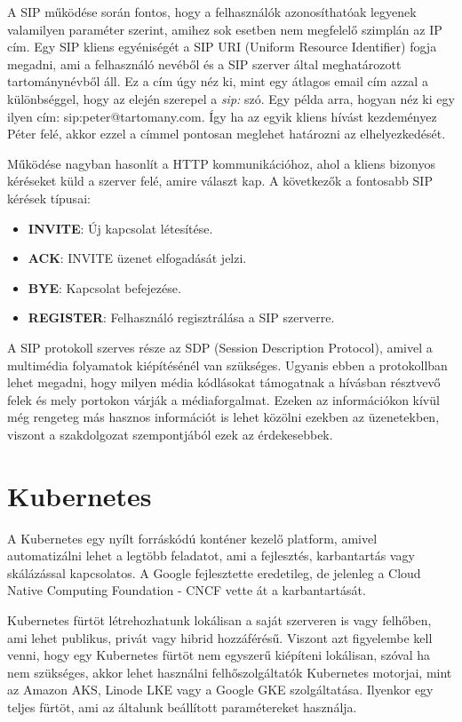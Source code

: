 A SIP működése során fontos, hogy a felhasználók azonosíthatóak legyenek valamilyen
paraméter szerint, amihez sok esetben nem megfelelő szimplán az IP cím. Egy 
SIP kliens egyéniségét a SIP URI (Uniform Resource Identifier) fogja megadni, ami
a  felhasználó nevéből és a SIP szerver által meghatározott tartománynévből áll.
Ez a cím úgy néz ki, mint egy átlagos email cím azzal a különbséggel, hogy az 
elején szerepel a \textit{sip:} szó. Egy példa arra, hogyan néz ki egy ilyen cím: 
sip:peter@tartomany.com. Így ha az egyik kliens hívást kezdeményez Péter felé,
akkor ezzel a címmel pontosan meglehet határozni az elhelyezkedését. 

Működése nagyban hasonlít a HTTP kommunikációhoz, ahol a kliens bizonyos kéréseket
küld a szerver felé, amire választ kap. A következők a fontosabb SIP kérések típusai: 

\begin{itemize}
	\item \textbf{INVITE}: Új kapcsolat létesítése.
	\item \textbf{ACK}: INVITE üzenet elfogadását jelzi. 
	\item \textbf{BYE}: Kapcsolat befejezése. 
	\item \textbf{REGISTER}: Felhasználó regisztrálása a SIP szerverre. 
\end{itemize}

A SIP protokoll szerves része az SDP (Session Description Protocol), amivel a multimédia
folyamatok kiépítésénél van szükséges. Ugyanis ebben a protokollban lehet megadni,
hogy milyen média kódlásokat támogatnak a hívásban résztvevő felek és mely
portokon várják a médiaforgalmat. Ezeken az információkon kívül még rengeteg 
más hasznos információt is lehet közölni ezekben az üzenetekben, viszont a 
szakdolgozat szempontjából ezek az érdekesebbek. 

\section{Kubernetes}

A Kubernetes egy nyílt forráskódú konténer kezelő platform, amivel automatizálni
lehet a legtöbb feladatot, ami a fejlesztés, karbantartás vagy skálázással 
kapcsolatos. A Google fejlesztette eredetileg, de jelenleg a Cloud Native
Computing Foundation - CNCF vette át a karbantartását. 

Kubernetes fürtöt létrehozhatunk lokálisan a saját szerveren is vagy felhőben,
ami lehet publikus, privát vagy hibrid hozzáférésű. Viszont azt figyelembe 
kell venni, hogy egy Kubernetes fürtöt nem egyszerű kiépíteni lokálisan, 
szóval ha nem szükséges, akkor lehet használni felhőszolgáltatók Kubernetes 
motorjai, mint az Amazon AKS, Linode LKE vagy a Google GKE szolgáltatása.
Ilyenkor egy teljes fürtöt, ami az általunk beállított paramétereket használja.

